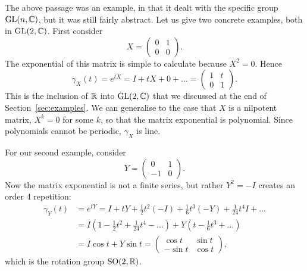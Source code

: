 \begin{example}
\label{eg:subgroups of GL2C}
The above passage was an example, in that it dealt with the specific group $\mathrm{GL}(n,\mathbb{C})$, but it was still fairly abstract.
Let us give two concrete examples, both in $\mathrm{GL}(2,\mathbb{C})$.
First consider
\[
X = \begin{pmatrix}
0 & 1 \\ 0 & 0
\end{pmatrix}.
\]
The exponential of this matrix is simple to calculate because $X^2 = 0$.
Hence
\[
\gamma_X(t) = e^{tX} = I + tX + 0 + \dots
= \begin{pmatrix}
1 & t \\ 0 & 1
\end{pmatrix}.
\]
This is the inclusion of $\mathbb{R}$ into $\mathrm{GL}(2,\mathbb{C})$ that we discussed at the end of Section~\ref{sec:examples}.
We can generalise to the case that $X$ is a nilpotent matrix, $X^k = 0$ for some $k$, so that the matrix exponential is polynomial.
Since polynomials cannot be periodic, $\gamma_X$ is line.

For our second example, consider
\[
Y = \begin{pmatrix}
0 & 1 \\ -1 & 0
\end{pmatrix}.
\]
Now the matrix exponential is not a finite series, but rather $Y^2 = -I$ creates an order 4 repetition:
\begin{align*}
\gamma_Y(t)
&= e^{tY}
= I + tY + \frac{1}{2}t^2(-I) + \frac{1}{6}t^3(-Y) + \frac{1}{24}t^4 I + \dots \\
&= I\left( 1 - \frac{1}{2}t^2 + \frac{1}{24}t^4 - \dots\right) + Y\left(t - \frac{1}{6}t^3 + \dots \right) \\
&= I \cos t + Y \sin t
= \begin{pmatrix}
\cos t & \sin t \\ - \sin t & \cos t
\end{pmatrix},
\end{align*}
which is the rotation group $\mathrm{SO}(2,\mathbb{R})$.
\end{example}


